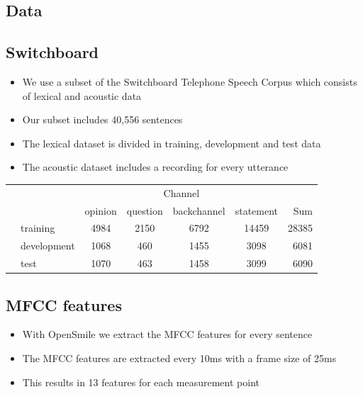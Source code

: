 \documentclass[a0,landscape]{a0poster}
\begin{document}
\begin{multicols}{3}

\color{Black} %
\large

\section*{Data}
\subsection*{Switchboard}

\begin{itemize}
	\item We use a subset of the Switchboard Telephone Speech Corpus which consists of lexical and acoustic data
	\item Our subset includes 40,556 sentences
	\item The lexical dataset is divided in training, development and test data
	\item The acoustic dataset includes a recording for every utterance
\end{itemize}

	\begin{tabular}{ c l| c c c c || r}
		&\multicolumn{1}{c}{} & \multicolumn{4}{c}{Channel} & \\
		& & opinion & question & backchannel & statement & Sum\\
		\cline{2-7}
		{\multirow{3}{2cm}{\centering \rotatebox[origin=c]{90}{Dataset}}}& training & 4984 & 2150 & 6792 & 14459 & 28385\\
		& development & 1068 & 460 & 1455 & 3098 & 6081\\
		& test & 1070 & 463 & 1458 & 3099 & 6090\\
	\end{tabular}

\subsection*{MFCC features}
\begin{itemize}
	\item With OpenSmile we extract the MFCC features for every sentence
	\item The MFCC features are extracted every 10ms with a frame size of 25ms
	\item This results in 13 features for each measurement point
\end{itemize}


\end{multicols}
\end{document}
